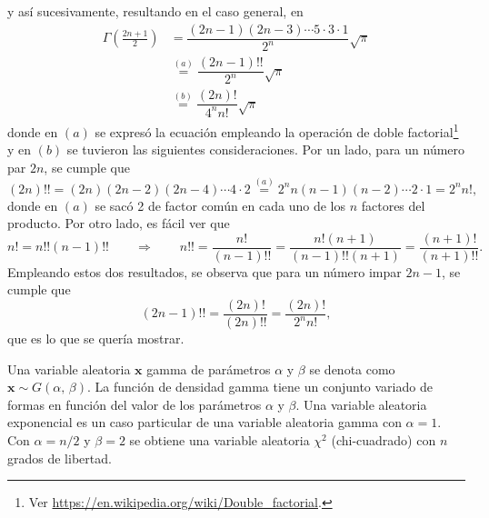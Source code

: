 \documentclass[a4paper]{report}
\newcommand{\x}{\mathbf{x}}
\begin{document}
y así sucesivamente, resultando en el caso general, en
\begin{align*}
 \Gamma\left(\frac{2n+1}{2}\right)&=\dfrac{(2n-1)(2n-3)\cdots5\cdot3\cdot1}{2^n}\sqrt{\pi}\\
 &\overset{(a)}{=}\dfrac{(2n-1)!!}{2^n}\sqrt{\pi}\\
 &\overset{(b)}{=}\dfrac{(2n)!}{4^nn!}\sqrt{\pi}
\end{align*}
donde en \((a)\) se expresó la ecuación empleando la operación de doble factorial\footnote{Ver \url{https://en.wikipedia.org/wiki/Double_factorial}.} y en \((b)\) se tuvieron las siguientes consideraciones. Por un lado, para un número par \(2n\), se cumple que
\[
 (2n)!!=(2n)(2n-2)(2n-4)\cdots4\cdot2\overset{(a)}{=}2^nn(n-1)(n-2)\cdots2\cdot1=2^nn!,
\]
donde en \((a)\) se sacó 2 de factor común en cada uno de los \(n\) factores del producto.
Por otro lado, es fácil ver que
\[
 n!=n!!(n-1)!!\qquad\Rightarrow\qquad n!!=\frac{n!}{(n-1)!!}=\frac{n!(n+1)}{(n-1)!!(n+1)}=\frac{(n+1)!}{(n+1)!!}.
\]
Empleando estos dos resultados, se observa que para un número impar \(2n-1\), se cumple que
\[
 (2n-1)!!=\frac{(2n)!}{(2n)!!}=\frac{(2n)!}{2^nn!},
\]
que es lo que se quería mostrar.



Una variable aleatoria \(\x\) gamma de parámetros \(\alpha\) y \(\beta\) se denota como \(\x\sim G(\alpha,\, \beta)\). La función de densidad gamma tiene un conjunto variado de formas en función del valor de los parámetros \(\alpha\) y \(\beta\). Una variable aleatoria exponencial es un caso particular de una variable aleatoria gamma con \(\alpha=1\). Con \(\alpha=n/2\) y \(\beta=2\) se obtiene una variable aleatoria \(\chi^2\) (chi-cuadrado) con \(n\) grados de libertad.
\end{document}

